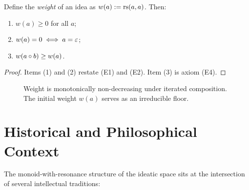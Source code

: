 \begin{theorem}\label{thm:weight-monotone}
Define the \emph{weight} of an idea as $w(a) := \mathrm{rs}(a, a)$. Then:
\begin{enumerate}
    \item $w(a) \geq 0$ for all $a$;
    \item $w(a) = 0 \iff a = \varepsilon$;
    \item $w(a \circ b) \geq w(a)$.
\end{enumerate}
\end{theorem}
\begin{proof}
Items (1) and (2) restate (E1) and (E2). Item (3) is axiom (E4).
\end{proof}

\begin{figure}[ht]
\centering
{}
\caption{Weight is monotonically non-decreasing under iterated composition.
The initial weight $w(a)$ serves as an irreducible floor.}
\label{fig:weight-monotone}
\end{figure}

\section{Historical and Philosophical Context}

The monoid-with-resonance structure of the ideatic space sits at the
intersection of several intellectual traditions:

